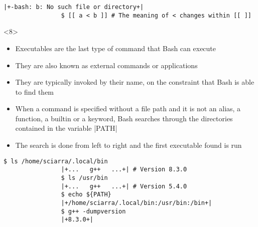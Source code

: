 \begin{frame}
\begin{overlayarea}{\textwidth}{0.7\textheight}
\begin{onlyenv}
\begin{lstlisting}[style=MyBash]
                |+-bash: b: No such file or directory+|
                $ [[ a < b ]] # The meaning of < changes within [[ ]]
            \end{lstlisting}
        \end{onlyenv}
        \begin{onlyenv}<8>
            \begin{itemize}
                \item Executables are the last type of command that Bash can execute
                \item They are also known as external commands or applications
                \item They are typically invoked by their name, on the constraint that Bash is able to find them
                \item When a command is specified without a file path and it is \alert{not an alias, a function, a builtin or a keyword}, Bash searches through the directories contained in the variable \bash|PATH|
                \item The search is done from left to right and the first executable found is run
            \end{itemize}
            \begin{lstlisting}[style=MyBash]
                $ ls /home/sciarra/.local/bin
                |+...   g++   ...+| # Version 8.3.0
                $ ls /usr/bin
                |+...   g++   ...+| # Version 5.4.0
                $ echo ${PATH}
                |+/home/sciarra/.local/bin:/usr/bin:/bin+|
                $ g++ -dumpversion
                |+8.3.0+|
            \end{lstlisting}
        \end{onlyenv}
    \end{overlayarea}
\end{frame}
